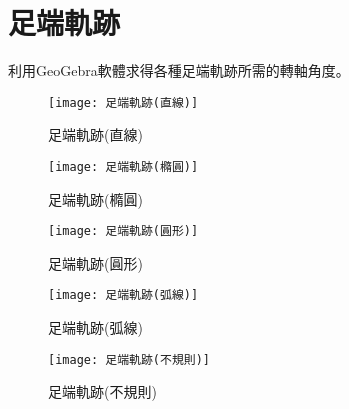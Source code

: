 \section*{足端軌跡}
利用GeoGebra軟體求得各種足端軌跡所需的轉軸角度。\

\begin{figure}[htbp]
  \centering
  \begin{minipage}{0.45\linewidth}
    \centering
    \texttt{[image: 足端軌跡(直線)]}
    \caption{足端軌跡(直線)}
    \label{足端軌跡(直線)}
  \end{minipage}
  \hfill
  \begin{minipage}{0.45\linewidth}
    \centering
    \texttt{[image: 足端軌跡(橢圓)]}
    \caption{足端軌跡(橢圓)}
    \label{足端軌跡(橢圓)}
  \end{minipage}
  
  \vspace{0.5cm} %
  
  \begin{minipage}{0.45\linewidth}
    \centering
    \texttt{[image: 足端軌跡(圓形)]}
    \caption{足端軌跡(圓形)}
    \label{足端軌跡(圓形)}
  \end{minipage}
  \hfill
  \begin{minipage}{0.45\textwidth}
    \centering
    \texttt{[image: 足端軌跡(弧線)]}
    \caption{足端軌跡(弧線)}
    \label{足端軌跡(弧線)}
  \end{minipage}
  
  \vspace{0.5cm} %
  
  \begin{minipage}{0.45\linewidth}
    \centering
    \texttt{[image: 足端軌跡(不規則)]}
    \caption{足端軌跡(不規則)}
    \label{足端軌跡(不規則)}
  \end{minipage}
\end{figure}
  
\newpage
